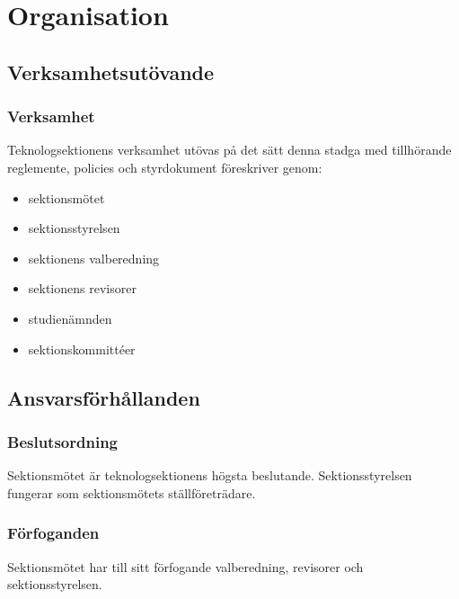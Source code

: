 \section{Organisation}

\subsection{Verksamhetsutövande}

\subsubsection{Verksamhet}
Teknologsektionens verksamhet utövas på det sätt denna stadga med tillhörande reglemente, policies och styrdokument föreskriver genom:

\begin{itemize}
	\item sektionsmötet
	\item sektionsstyrelsen \STYRIT{}
	\item sektionens valberedning
	\item sektionens revisorer
	\item studienämnden \SNIT{}
	\item sektionskommittéer
\end{itemize}

\subsection{Ansvarsförhållanden}

\subsubsection{Beslutsordning}
Sektionsmötet är teknologsektionens högsta beslutande. Sektionsstyrelsen fungerar som sektionsmötets ställföreträdare.

\subsubsection{Förfoganden}
Sektionsmötet har till sitt förfogande valberedning, revisorer och sektionsstyrelsen.

